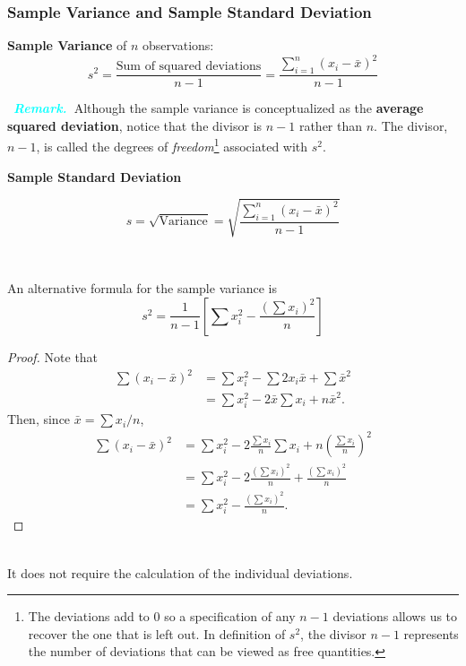 \documentclass[12pt,a4paper]{article}
\newcommand{\remark}{\textcolor{cyan}{\textbf{\textit{Remark.}\ }}}
\newcommand{\mean}[1]{\bar{#1}}
\begin{document}
\subsubsection{Sample Variance and Sample Standard Deviation}
\begin{tcolorbox}[colback=white]
	\textbf{Sample Variance} of $n$ observations: \[
		s^2=\frac{\text{Sum of squared deviations}}{n-1} = \frac{\sum_{i=1}^n(x_i-\mean{x})^2}{n-1}
	\]
\end{tcolorbox}\
\remark Although the sample variance is conceptualized as the \textbf{average squared deviation}, notice that the divisor is $n-1$ rather than $n$. The divisor, $n-1$, is called the degrees of \textit{freedom}\footnote[1]{
The deviations add to 0 so a specification of any $n-1$ deviations allows us to recover the one that is left out. In definition of $s^2$, the divisor $n-1$ represents the number of deviations that can be viewed as free quantities.} associated with $s^2$.\\
\begin{tcolorbox}[colback=white]
	\begin{center}
		\textbf{Sample Standard Deviation}
	\end{center} \[
	s=\sqrt{\text{Variance}} = \sqrt{\frac{\sum_{i=1}^n(x_i-\mean{x})^2}{n-1}}
	\]
\end{tcolorbox}\
\\
\begin{tcolorbox}[colback=white]
	An alternative formula for the sample variance is \[
	s^2=\frac{1}{n-1}\left[\sum x_i^2-\frac{(\sum x_i)^2}{n} \right]
	\] \begin{proof}
		Note that \begin{align*}
		\sum(x_i-\mean{x})^2&=\sum x_i^2 - \sum2x_i\mean{x} +\sum\mean{x}^2 \\
		&=\sum x_i^2 - 2\mean{x}\sum x_i +n\mean{x}^2.
		\end{align*} Then, since $\mean{x}=\sum x_i/n$, \begin{align*}
		\sum(x_i-\mean{x})^2 &= \sum x_i^2 - 2\frac{\sum x_i}{n}\sum x_i +n\left(\frac{\sum x_i}{n}\right)^2 \\
		&= \sum x_i^2 - 2\frac{(\sum x_i)^2}{n} +\frac{(\sum x_i)^2}{n} \\
		&= \sum x_i^2 - \frac{(\sum x_i)^2}{n}.
		\end{align*}
	\end{proof}	
\end{tcolorbox}\
\\
It does not require the calculation of the individual deviations.
\end{document}
